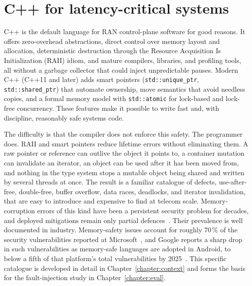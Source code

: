 \documentclass[english,twoside,openright,a4paper,censored,csm,software-track-2020]{HYthesisML}
\begin{document}
\section{C++ for latency-critical systems}\label{sec:cpplatency}
C++ is the default language for RAN control-plane software for good reasons. It offers
zero-overhead abstractions, direct control over memory layout and allocation, deterministic
destruction through the Resource Acquisition Is Initialization (RAII) idiom, and mature
compilers, libraries, and profiling tools, all without a garbage collector that could inject
unpredictable pauses. Modern C++ (C++11 and later) adds smart pointers
(\texttt{std::unique\_ptr}, \texttt{std::shared\_ptr}) that automate ownership, move semantics
that avoid needless copies, and a formal memory model with \texttt{std::atomic} for
lock-based and lock-free concurrency. These features make it possible to write fast and, with
discipline, reasonably safe systems code.

The difficulty is that the compiler does not enforce this safety. The programmer does. RAII and
smart pointers reduce lifetime errors without eliminating them. A raw pointer or reference can
outlive the object it points to, a container mutation can invalidate an iterator, an object can
be used after it has been moved from, and nothing in the type system stops a mutable object
being shared and written by several threads at once. The result is a familiar catalogue of
defects, use-after-free, double-free, buffer overflow, data races, deadlocks, and iterator
invalidation, that are easy to introduce and expensive to find at telecom scale. Memory-corruption errors of this kind have
been a persistent security problem for decades, and deployed mitigations remain only partial
defences~\cite{szekeres2013sok}. Their prevalence is well documented in
industry. Memory-safety issues account for roughly 70\,\% of the security vulnerabilities
reported at Microsoft~\cite{msrc2019memory}, and Google reports a sharp drop in such
vulnerabilities as memory-safe languages are adopted in Android, to below a fifth of that
platform's total vulnerabilities by
2025~\cite{google2022android,vanderstoep2025android}. This
specific catalogue is developed in detail in Chapter~\ref{chapter:context} and forms the basis
for the fault-injection study in Chapter~\ref{chapter:eval}.
\end{document}
